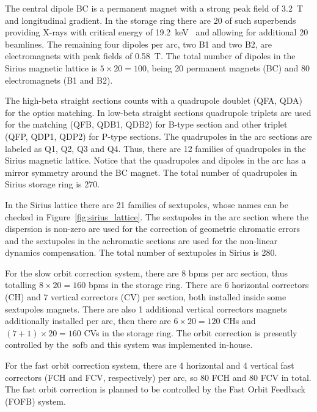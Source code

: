 The central dipole BC is a permanent magnet with a strong peak field of \SI{3.2}{\tesla} and longitudinal gradient. In the storage ring there are 20 of such superbends providing X-rays with critical energy of \SI{19.2}{\kilo\electronvolt}~\cite{Liu2016b} and allowing for additional 20 beamlines. The remaining four dipoles per arc, two B1 and two B2, are electromagnets with peak fields of \SI{0.58}{\tesla}. The total number of dipoles in the Sirius magnetic lattice is $5 \times 20 = 100$, being 20 permanent magnets (BC) and 80 electromagnets (B1 and B2).

The high-beta straight sections counts with a quadrupole doublet (QFA, QDA) for the optics matching. In low-beta straight sections quadrupole triplets are used for the matching (QFB, QDB1, QDB2) for B-type section and other triplet (QFP, QDP1, QDP2) for P-type sections. The quadrupoles in the arc sections are labeled as Q1, Q2, Q3 and Q4. Thus, there are 12 families of quadrupoles in the Sirius magnetic lattice. Notice that the quadrupoles and dipoles in the arc has a mirror symmetry around the BC magnet. The total number of quadrupoles in Sirius storage ring is 270. 

In the Sirius lattice there are 21 families of sextupoles, whose names can be checked in Figure~\ref{fig:sirius_lattice}. The sextupoles in the arc section where the dispersion is non-zero are used for the correction of geometric chromatic errors and the sextupoles in the achromatic sections are used for the non-linear dynamics compensation. The total number of sextupoles in Sirius is 280.

For the slow orbit correction system, there are 8 \glspl{bpm} per arc section, thus totalling $8 \times 20 = 160$ \glspl{bpm} in the storage ring. There are 6 horizontal correctors (CH) and 7 vertical correctors (CV) per section, both installed inside some sextupoles magnets. There are also 1 additional vertical correctors magnets additionally installed per arc, then there are $6 \times 20 = 120$ CHs and $(7 + 1) \times 20 = 160$ CVs in the storage ring. The orbit correction is presently controlled by the~\gls{sofb} and this system was implemented in-house.

For the fast orbit correction system, there are 4 horizontal and 4 vertical fast correctors (FCH and FCV, respectively) per arc, so 80 FCH and 80 FCV in total. The fast orbit correction is planned to be controlled by the Fast Orbit Feedback (FOFB) system.

